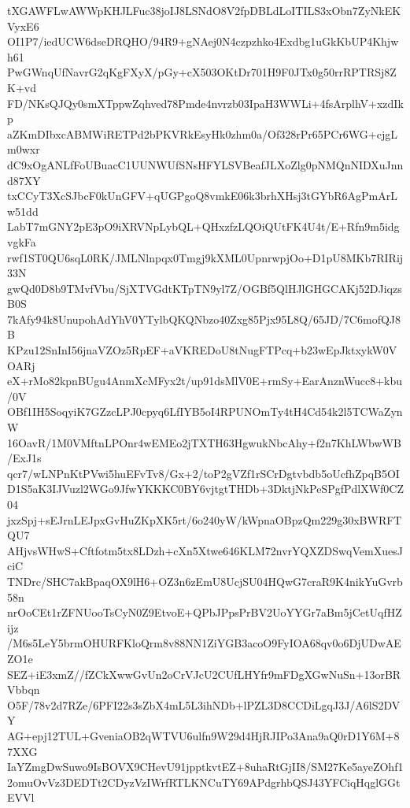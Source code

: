 tXGAWFLwAWWpKHJLFuc38joIJ8LSNdO8V2fpDBLdLoITILS3xObn7ZyNkEKVyxE6
OI1P7/iedUCW6dseDRQHO/94R9+gNAej0N4czpzhko4Exdbg1uGkKbUP4Khjwh61
PwGWnqUfNavrG2qKgFXyX/pGy+cX503OKtDr701H9F0JTx0g50rrRPTRSj8ZK+vd
FD/NKsQJQy0smXTppwZqhved78Pmde4nvrzb03IpaH3WWLi+4fsArplhV+xzdIkp
aZKmDIbxcABMWiRETPd2bPKVRkEsyHk0zhm0a/Of328rPr65PCr6WG+cjgLm0wxr
dC9xOgANLfFoUBuacC1UUNWUfSNsHFYLSVBeafJLXoZlg0pNMQnNIDXuJnnd87XY
txCCyT3XcSJbcF0kUnGFV+qUGPgoQ8vmkE06k3brhXHsj3tGYbR6AgPmArLw51dd
LabT7mGNY2pE3pO9iXRVNpLybQL+QHxzfzLQOiQUtFK4U4t/E+Rfn9m5idgvgkFa
rwf1ST0QU6sqL0RK/JMLNlnpqx0Tmgj9kXML0UpnrwpjOo+D1pU8MKb7RIRij33N
gwQd0D8b9TMvfVbu/SjXTVGdtKTpTN9yl7Z/OGBf5QlHJlGHGCAKj52DJiqzsB0S
7kAfy94k8UnupohAdYhV0YTylbQKQNbzo40Zxg85Pjx95L8Q/65JD/7C6mofQJ8B
KPzu12SnInI56jnaVZOz5RpEF+aVKREDoU8tNugFTPcq+b23wEpJktxykW0VOARj
eX+rMo82kpnBUgu4AnmXcMFyx2t/up91dsMlV0E+rmSy+EarAnznWucc8+kbu/0V
OBf1IH5SoqyiK7GZzcLPJ0cpyq6LfIYB5oI4RPUNOmTy4tH4Cd54k2l5TCWaZynW
16OavR/1M0VMftnLPOnr4wEMEo2jTXTH63HgwukNbcAhy+f2n7KhLWbwWB/ExJ1s
qcr7/wLNPnKtPVwi5huEFvTv8/Gx+2/toP2gVZf1rSCrDgtvbdb5oUcfhZpqB5OI
D1S5aK3IJVuzl2WGo9JfwYKKKC0BY6vjtgtTHDb+3DktjNkPeSPgfPdlXWf0CZ04
jxzSpj+sEJrnLEJpxGvHuZKpXK5rt/6o240yW/kWpnaOBpzQm229g30xBWRFTQU7
AHjvsWHwS+Cftfotm5tx8LDzh+cXn5Xtwe646KLM72nvrYQXZDSwqVemXuesJciC
TNDrc/SHC7akBpaqOX9lH6+OZ3n6zEmU8UcjSU04HQwG7craR9K4nikYuGvrb58n
nrOoCEt1rZFNUooTsCyN0Z9EtvoE+QPbJPpsPrBV2UoYYGr7aBm5jCetUqfHZijz
/M6s5LeY5brmOHURFKloQrm8v88NN1ZiYGB3acoO9FyIOA68qv0o6DjUDwAEZO1e
SEZ+iE3xmZ//fZCkXwwGvUn2oCrVJcU2CUfLHYfr9mFDgXGwNuSn+13orBRVbbqn
O5F/78v2d7RZe/6PFI22s3sZbX4mL5L3ihNDb+lPZL3D8CCDiLgqJ3J/A6lS2DVY
AG+epj12TUL+GveniaOB2qWTVU6ulfn9W29d4HjRJIPo3Ana9aQ0rD1Y6M+87XXG
IaYZmgDwSuwo9IsBOVX9CHevU91jpptkvtEZ+8uhaRtGjII8/SM27Ke5ayeZOhf1
2omuOvVz3DEDTt2CDyzVzIWrfRTLKNCuTY69APdgrhbQSJ43YFCiqHqglGGtEVVl
